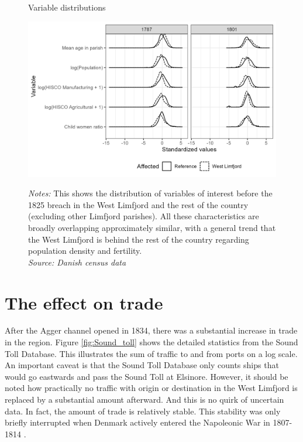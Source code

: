 \documentclass[11pt]{article}
\begin{document}
\begin{figure}
\begin{center}
  \caption{Variable distributions}
  \label{fig:bal}
  \includegraphics[width=1\textwidth]{Plots/Balancing_plot.png}
  \parbox{0.9\textwidth}{
  \caption*{\footnotesize \textit{Notes:} This shows the distribution of variables of interest before the 1825 breach in the West Limfjord and the rest of the country (excluding other Limfjord parishes). All these characteristics are broadly overlapping approximately similar, with a general trend that the West Limfjord is behind the rest of the country regarding population density and fertility. \\ \textit{Source: Danish census data}}
}
\end{center}
\end{figure}

\FloatBarrier
\section{The effect on trade}
After the Agger channel opened in 1834, there was a substantial increase in trade in the region. Figure \ref{fig:Sound_toll} shows the detailed statistics from the Sound Toll Database. This illustrates the sum of traffic to and from ports on a log scale. An important caveat is that the Sound Toll Database only counts ships that would go eastwards and pass the Sound Toll at Elsinore. However, it should be noted how practically no traffic with origin or destination in the West Limfjord is replaced by a substantial amount afterward. And this is no quirk of uncertain data. In fact, the amount of trade is relatively stable. This stability was only briefly interrupted when Denmark actively entered the Napoleonic War in 1807-1814 \citep{Feldbaek2015}. 
\end{document}
